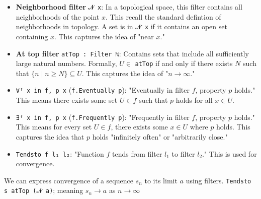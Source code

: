\begin{itemize}
    \item \textbf{Neighborhood filter} \lstinline[language=lean]|𝓝 x|:
          In a topological space,
          this filter contains all neighborhoods of the point $x$.
          This recall the standard defintion of neighborhoods in topology.
          A set is in \lstinline[language=lean]|𝓝 x| if it contains an
          open set containing $x$. This captures the idea of "near $x$."
    \item \textbf{At top filter} \lstinline[language=lean]|atTop : Filter ℕ|: Contains sets that
          include all sufficiently large natural numbers.
          Formally, $U \in$ \lstinline[language=lean]|atTop| if and only if there
          exists $N$ such that $\{n \mid n \geq N\} \subseteq U$.
          This captures the idea of "$n \to \infty$."
    \item \lstinline[language=lean]|∀ᶠ x in f, p x| (\lstinline[language=lean]|f.Eventually p|):
          "Eventually in filter $f$, property $p$ holds."
          This means there exists some set $U \in f$ such that $p$ holds for all $x \in U$.
    \item \lstinline[language=lean]|∃ᶠ x in f, p x| (\lstinline[language=lean]|f.Frequently p|):
          "Frequently in filter $f$, property $p$ holds." This means for every set $U \in f$, there exists
          some $x \in U$ where $p$ holds. This captures the idea that $p$ holds "infinitely often" or
          "arbitrarily close."
    \item \lstinline[language=lean]|Tendsto f l₁ l₂|: "Function $f$ tends from filter
          $l_1$ to filter $l_2$." This is used for convergence.
\end{itemize}
\begin{example}
    We can express convergence of a sequence $s_n$ to its limit $a$ using filters.
    \lstinline[language=lean]|Tendsto s atTop (𝓝 a)|; meaning $s_n \to a$ as $n \to \infty$
\end{example}
